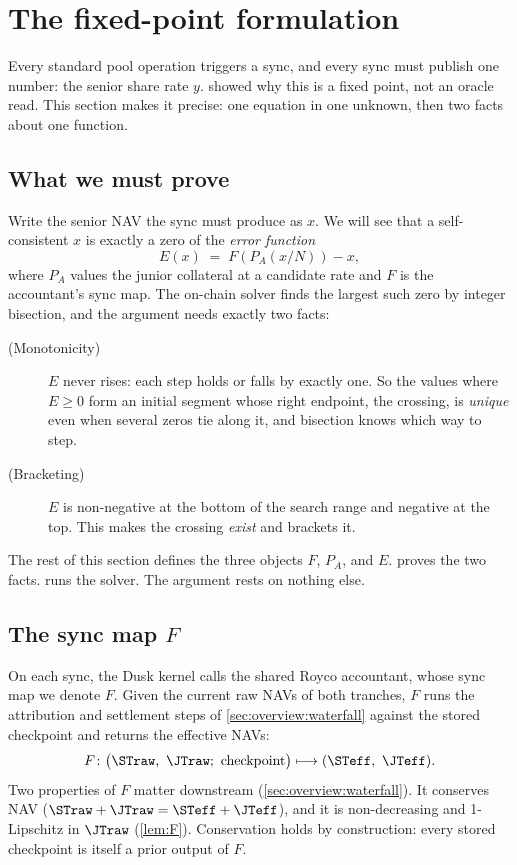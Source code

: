 \section{The fixed-point formulation}
\label{sec:setup}

Every standard pool operation triggers a sync, and every sync must publish one
number: the senior share rate $y$. 
showed why this is a fixed point, not an oracle read. This section makes
it precise: one equation in one unknown, then two facts about one
function.

\subsection{What we must prove}
\label{sec:setup:roadmap}

Write the senior NAV the sync must produce as $x$. We will see that a
self-consistent $x$ is exactly a zero of the \emph{error function}
\[
  E(x) \;=\; F\!\left(P_A(x / N)\right) - x,
\]
where $P_A$ values the junior collateral at a candidate rate and $F$ is
the accountant's sync map. The on-chain solver finds the largest such zero by
integer bisection, and the argument needs exactly two facts:

\begin{description}
  \item[(Monotonicity)] $E$ never rises: each step holds or falls by
    exactly one. So the values where $E \geq 0$ form an initial segment
    whose right endpoint, the crossing, is \emph{unique} even when
    several zeros tie along it, and bisection knows which way to step.
  \item[(Bracketing)] $E$ is non-negative at the bottom of the search range
    and negative at the top. This makes the crossing \emph{exist} and
    brackets it.
\end{description}

The rest of this section defines the three objects $F$, $P_A$, and $E$.
 proves the two facts.  runs the
solver. The argument rests on nothing else.

\subsection{The sync map $F$}
\label{sec:setup:F}

On each sync, the Dusk kernel calls the shared Royco accountant, whose
sync map we denote $F$. Given the
current raw NAVs of both tranches, $F$ runs the attribution and
settlement steps of \cref{sec:overview:waterfall} against the stored
checkpoint and returns the effective NAVs:
\[
  F\colon \bigl(\STraw,\ \JTraw;\ \text{checkpoint}\bigr) \longmapsto (\STeff,\ \JTeff).
\]
Two properties of $F$ matter downstream (\cref{sec:overview:waterfall}).
It conserves NAV ($\STraw + \JTraw = \STeff + \JTeff$), and it is
non-decreasing and 1-Lipschitz in $\JTraw$ (\cref{lem:F}).
Conservation holds by construction: every stored checkpoint is itself a
prior output of $F$.

